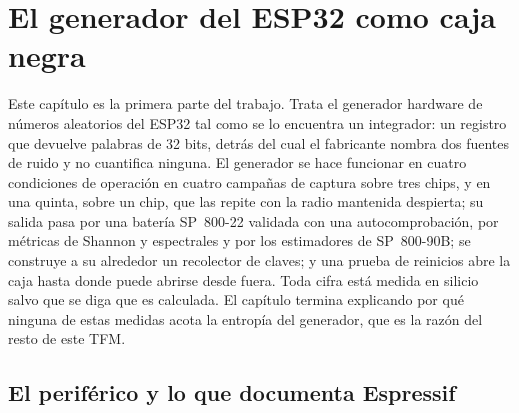 \chapter{El generador del ESP32 como caja negra}
\label{ch:esp32}


Este capítulo es la primera parte del trabajo. Trata el generador hardware
de números aleatorios del ESP32 tal como se lo encuentra un integrador: un
registro que devuelve palabras de 32 bits, detrás del cual el fabricante
nombra dos fuentes de ruido y no cuantifica ninguna. El generador se hace
funcionar en cuatro condiciones de operación en cuatro campañas de captura sobre tres chips,
y en una quinta, sobre un chip, que las repite con la radio mantenida
despierta; su salida pasa por una batería SP~800-22 validada con una
autocomprobación, por métricas de Shannon y espectrales y por los
estimadores de SP~800-90B; se construye a su alrededor un recolector de
claves; y una prueba de reinicios abre la caja hasta donde puede abrirse
desde fuera. Toda cifra está medida \meas{} en silicio salvo que se diga
que es calculada. El capítulo termina explicando por qué ninguna de estas
medidas acota la entropía del generador, que es la razón del resto de
este TFM.

\section{El periférico y lo que documenta Espressif}
\label{sec:esp32_periph}

